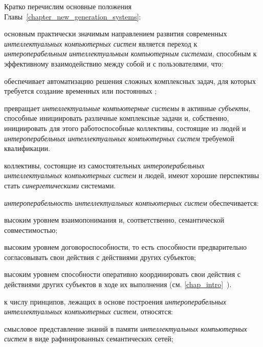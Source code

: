 Кратко перечислим основные положения Главы~\ref{chapter_new_generation_systems}:

\begin{textitemize}
	\item основным практически значимым направлением развития современных \textit{интеллектуальных компьютерных систем} является переход к \textit{интероперабельным} \textit{интеллектуальным компьютерным системам}, способным к эффективному взаимодействию между собой и с пользователями, что:
	\begin{textitemize}
		\item обеспечивает автоматизацию решения сложных комплексных задач, для которых требуется создание временных или постоянных ;
		\item превращает \textit{интеллектуальные компьютерные системы} в  активные \textit{субъекты}, способные инициировать различные комплексные задачи и, собственно, инициировать для этого работоспособные коллективы, состоящие из людей и \textit{интероперабельных интеллектуальных компьютерных систем} требуемой квалификации.
	\end{textitemize}
	\item коллективы, состоящие из самостоятельных \textit{интероперабельных интеллектуальных компьютерных систем} и людей, имеют хорошие перспективы стать \textit{синергетическими} системами.\\
	\item \textit{интероперабельность интеллектуальных компьютерных систем} обеспечивается:
	\begin{textitemize}
		\item высоким уровнем взаимопонимания и, соответственно, семантической совместимостью;
		\item высоким уровнем договороспособности, то есть способности предварительно согласовывать свои действия с действиями других субъектов;
		\item высоким уровнем способности оперативно координировать свои действия с действиями других субъектов в ходе их выполнения (см. \ref{chap_intro}~\nameref{chap_intro}).
	\end{textitemize}
	\item к числу принципов, лежащих в основе построения \textit{интероперабельных интеллектуальных компьютерных систем}, относятся:
	\begin{textitemize}
		\item смысловое представление знаний в памяти \textit{интеллектуальных компьютерных систем} в виде рафинированных семантических сетей;

\end{textitemize}
\end{textitemize}
